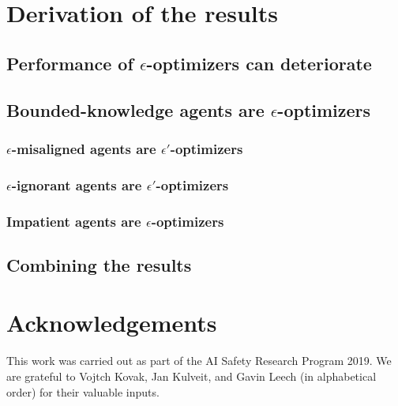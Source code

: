 \documentclass{article} %
\theoremstyle{remark}
\begin{document}
\section{Derivation of the results}

\subsection{Performance of \texorpdfstring{$\epsilon$}{epsilon}-optimizers can deteriorate}
\label{sec:policy_mod_techn}


\subsection{Bounded-knowledge agents are \texorpdfstring{$\epsilon$}{epsilon}-optimizers}
\label{sec:optimization_bounds_techn}


\subsubsection{\texorpdfstring{$\epsilon$}{epsilon}-misaligned agents are \texorpdfstring{$\epsilon'$}{epsilon'}-optimizers}
\label{sec:belief_techn}


\subsubsection{\texorpdfstring{$\epsilon$}{epsilon}-ignorant agents are \texorpdfstring{$\epsilon'$}{epsilon'}-optimizers}
\label{sec:belief_techn}


\subsubsection{Impatient agents are \texorpdfstring{$\epsilon$}{epsilon}-optimizers}
\label{sec:gammas_techn}


\subsection{Combining the results}
\label{sec:combining_techn}


\section{Acknowledgements}
This work was carried out as part of the AI Safety Research Program 2019.
We are grateful to Vojtch Kovak, Jan Kulveit, and Gavin Leech (in alphabetical order) for their valuable inputs.
\end{document}
